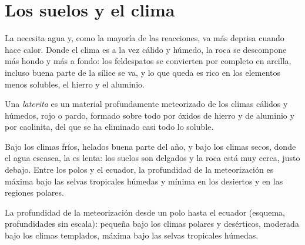 \section{Los suelos y el clima}

La  necesita agua y, como la mayoría de las reacciones,
va más deprisa cuando hace calor. Donde el clima es a la vez cálido y húmedo,
la roca se descompone más hondo y más a fondo: los feldespatos se convierten
por completo en arcilla, incluso buena parte de la sílice se va, y lo que
queda es rico en los elementos menos solubles, el hierro y el aluminio.

\begin{definition}[Laterita]\label{def:g10:soil-formation:laterite}
Una \emph{laterita} es un material profundamente meteorizado
de los climas cálidos y húmedos, rojo o pardo, formado sobre todo por óxidos
de hierro y de aluminio y por caolinita, del que se ha eliminado casi todo lo
soluble.
\end{definition}

Bajo los climas fríos, helados buena parte del año, y bajo los climas secos,
donde el agua escasea, la  es lenta: los suelos son
delgados y la roca está muy cerca, justo debajo. Entre los polos y el
ecuador, la profundidad de la meteorización es máxima bajo las selvas
tropicales húmedas y mínima en los desiertos y en las regiones polares.

\begin{omfigure}

{\small La profundidad de la meteorización desde un polo hasta el ecuador
(esquema, profundidades sin escala): pequeña bajo los climas polares y
desérticos, moderada bajo los climas templados, máxima bajo las selvas
tropicales húmedas.}
\end{omfigure}

